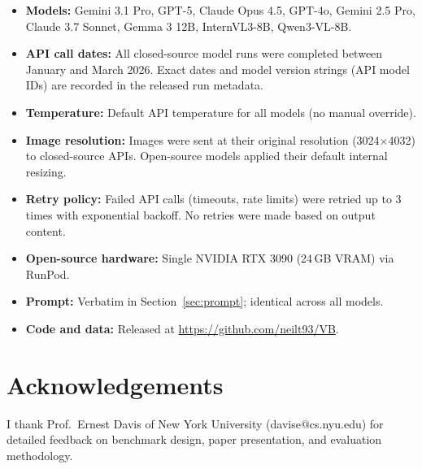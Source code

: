 \documentclass[11pt]{article}
\begin{document}
\begin{itemize}[noitemsep, topsep=3pt]
  \item \textbf{Models:} Gemini 3.1 Pro, GPT-5, Claude Opus 4.5, GPT-4o, Gemini 2.5 Pro, Claude 3.7 Sonnet, Gemma 3 12B, InternVL3-8B, Qwen3-VL-8B.
  \item \textbf{API call dates:} All closed-source model runs were completed between January and March 2026. Exact dates and model version strings (API model IDs) are recorded in the released run metadata.
  \item \textbf{Temperature:} Default API temperature for all models (no manual override).
  \item \textbf{Image resolution:} Images were sent at their original resolution (3024$\times$4032) to closed-source APIs. Open-source models applied their default internal resizing.
  \item \textbf{Retry policy:} Failed API calls (timeouts, rate limits) were retried up to 3 times with exponential backoff. No retries were made based on output content.
  \item \textbf{Open-source hardware:} Single NVIDIA RTX 3090 (24\,GB VRAM) via RunPod.
  \item \textbf{Prompt:} Verbatim in Section~\ref{sec:prompt}; identical across all models.
  \item \textbf{Code and data:} Released at \url{https://github.com/neilt93/VB}.
\end{itemize}

\section*{Acknowledgements}
I thank Prof.\ Ernest Davis of New York University (davise@cs.nyu.edu) for detailed feedback on benchmark design, paper presentation, and evaluation methodology.



\end{document}
